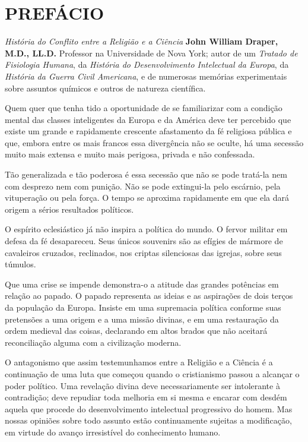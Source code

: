 \documentclass[11pt,a5paper,twoside,openany]{book}
\begin{document}
\tableofcontents
\newpage

\chapter*{PREFÁCIO}
\textit{História do Conflito entre a Religião e a Ciência} \textbf{John William Draper, M.D., LL.D.} Professor na Universidade de Nova York; autor de um \textit{Tratado de Fisiologia Humana}, da \textit{História do Desenvolvimento Intelectual da Europa}, da \textit{História da Guerra Civil Americana}, e de numerosas memórias experimentais sobre assuntos químicos e outros de natureza científica.

\par\medskip\noindent\hrulefill\par\medskip
Quem quer que tenha tido a oportunidade de se familiarizar com a condição mental das classes inteligentes da Europa e da América deve ter percebido que existe um grande e rapidamente crescente afastamento da fé religiosa pública e que, embora entre os mais francos essa divergência não se oculte, há uma secessão muito mais extensa e muito mais perigosa, privada e não confessada.

Tão generalizada e tão poderosa é essa secessão que não se pode tratá-la nem com desprezo nem com punição. Não se pode extingui-la pelo escárnio, pela vituperação ou pela força. O tempo se aproxima rapidamente em que ela dará origem a sérios resultados políticos.

O espírito eclesiástico já não inspira a política do mundo. O fervor militar em defesa da fé desapareceu. Seus únicos souvenirs são as efígies de mármore de cavaleiros cruzados, reclinados, nos criptas silenciosas das igrejas, sobre seus túmulos.

Que uma crise se impende demonstra-o a atitude das grandes potências em relação ao papado. O papado representa as ideias e as aspirações de dois terços da população da Europa. Insiste em uma supremacia política conforme suas pretensões a uma origem e a uma missão divinas, e em uma restauração da ordem medieval das coisas, declarando em altos brados que não aceitará reconciliação alguma com a civilização moderna.

O antagonismo que assim testemunhamos entre a Religião e a Ciência é a continuação de uma luta que começou quando o cristianismo passou a alcançar o poder político. Uma revelação divina deve necessariamente ser intolerante à contradição; deve repudiar toda melhoria em si mesma e encarar com desdém aquela que procede do desenvolvimento intelectual progressivo do homem. Mas nossas opiniões sobre todo assunto estão continuamente sujeitas a modificação, em virtude do avanço irresistível do conhecimento humano.
\end{document}
